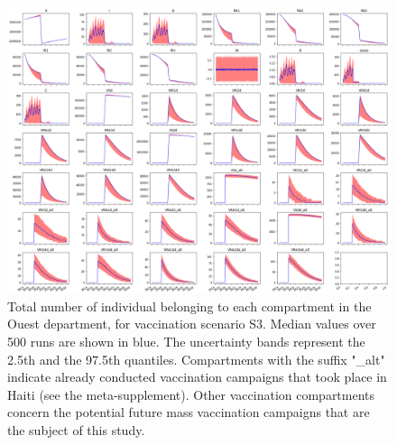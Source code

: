 \begin{figure}[htbp]
\begin{center}
\includegraphics[width=1.0\textwidth]{fig_cholera-haiti-ocv/comps.png}
\caption{Total number of individual belonging to each compartment in the Ouest department, for vaccination scenario S3. Median values over 500 runs are shown in blue. The uncertainty bands represent the 2.5th and the 97.5th quantiles. Compartments with the suffix "\_alt" indicate already conducted vaccination campaigns that took place in Haiti (see the meta-supplement). Other vaccination compartments concern the potential future mass vaccination campaigns that are the subject of this study.}
\label{figCompartiment}
\end{center}
\end{figure}

